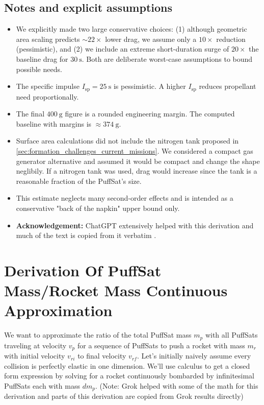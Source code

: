 \documentclass{article}
\begin{document}
\subsection*{Notes and explicit assumptions}
\begin{itemize}
  \item We explicitly made two large conservative choices: (1) although geometric area scaling predicts \(\sim22\times\) lower drag, we assume only a \(10\times\) reduction (pessimistic), and (2) we include an extreme short-duration surge of \(20\times\) the baseline drag for \(\SI{30}{\s}\).  Both are deliberate worst-case assumptions to bound possible needs.
  \item The specific impulse \(I_{\mathrm{sp}}=\SI{25}{\s}\) is pessimistic. A higher \(I_{\mathrm{sp}}\) reduces propellant need proportionally.
  \item The final \(\SI{400}{\g}\) figure is a rounded engineering margin. The computed baseline with margins is \(\approx\SI{374}{\g}\).
  \item Surface area calculations did not include the nitrogen tank proposed in \autoref{sec:formation_challenges_current_missions}.  We considered a compact gas generator alternative and assumed it would be compact and change the shape neglibily.   If a nitrogen tank was used, drag would increase since the tank is a reasonable fraction of the PuffSat's size.
  \item This estimate neglects many second-order effects and is intended as a conservative "back of the napkin" upper bound only.
  \item \textbf{Acknowledgement:} ChatGPT extensively helped with this derivation and much of the text is copied from it verbatim \cite{chatgpt}.
\end{itemize}



\section{Derivation Of PuffSat Mass/Rocket Mass Continuous Approximation}\label{sec:PuffSat_ratio_approximation}  We want to approximate the ratio of the total PuffSat mass \(m_p\) with all PuffSats traveling at velocity \(v_p\) for a sequence of PuffSats to push a rocket with mass \(m_r\) with initial velocity \(v_{ri}\) to final velocity \(v_{rf}\).   Let's initially naively assume every collision is perfectly elastic in one dimension.   We'll use calculus to get a  closed form expression by solving for a rocket  continuously bombarded by infinitesimal PuffSats each with mass \(dm_p\).   (Note: Grok \cite{grok}  helped with some of the math for this derivation and parts of this derivation are copied from Grok  results directly)
\end{document}
